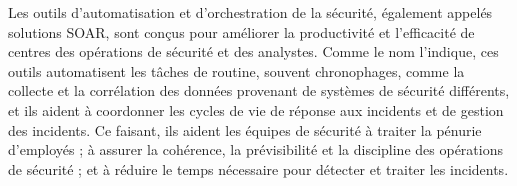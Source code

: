 Les outils d’automatisation et d’orchestration de la sécurité, également appelés solutions SOAR, sont conçus pour améliorer la productivité et l’efficacité de centres des opérations de sécurité et des analystes. Comme le nom l’indique, ces outils automatisent les tâches de routine, souvent chronophages, comme la collecte et la corrélation des données provenant de systèmes de sécurité différents, et ils aident à coordonner les cycles de vie de réponse aux incidents et de gestion des incidents. Ce faisant, ils aident les équipes de sécurité à traiter la pénurie d’employés ; à assurer la cohérence, la prévisibilité et la discipline des opérations de sécurité ; et à réduire le temps nécessaire pour détecter et traiter les incidents.